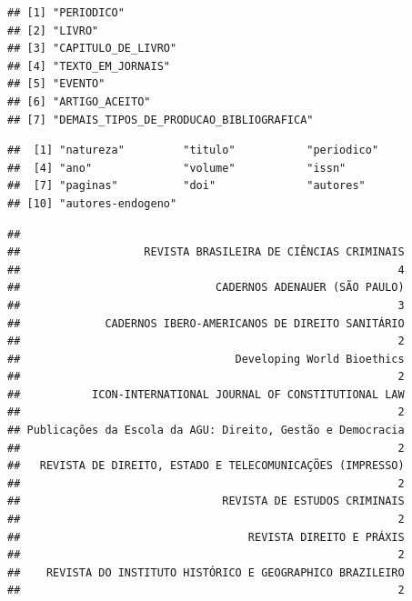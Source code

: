 \documentclass[]{article}
\newenvironment{Shaded}{\begin{snugshade}}{\end{snugshade}}
\newcommand{\KeywordTok}[1]{\textcolor[rgb]{0.13,0.29,0.53}{\textbf{#1}}}
\newcommand{\DataTypeTok}[1]{\textcolor[rgb]{0.13,0.29,0.53}{#1}}
\newcommand{\DecValTok}[1]{\textcolor[rgb]{0.00,0.00,0.81}{#1}}
\newcommand{\StringTok}[1]{\textcolor[rgb]{0.31,0.60,0.02}{#1}}
\newcommand{\OtherTok}[1]{\textcolor[rgb]{0.56,0.35,0.01}{#1}}
\newcommand{\OperatorTok}[1]{\textcolor[rgb]{0.81,0.36,0.00}{\textbf{#1}}}
\newcommand{\NormalTok}[1]{#1}
\begin{document}
\begin{verbatim}
## [1] "PERIODICO"                             
## [2] "LIVRO"                                 
## [3] "CAPITULO_DE_LIVRO"                     
## [4] "TEXTO_EM_JORNAIS"                      
## [5] "EVENTO"                                
## [6] "ARTIGO_ACEITO"                         
## [7] "DEMAIS_TIPOS_DE_PRODUCAO_BIBLIOGRAFICA"
\end{verbatim}

\begin{Shaded}
\end{Shaded}

\begin{verbatim}
##  [1] "natureza"         "titulo"           "periodico"       
##  [4] "ano"              "volume"           "issn"            
##  [7] "paginas"          "doi"              "autores"         
## [10] "autores-endogeno"
\end{verbatim}

\begin{Shaded}
\end{Shaded}

\begin{verbatim}
## 
##                   REVISTA BRASILEIRA DE CIÊNCIAS CRIMINAIS 
##                                                          4 
##                              CADERNOS ADENAUER (SÃO PAULO) 
##                                                          3 
##             CADERNOS IBERO-AMERICANOS DE DIREITO SANITÁRIO 
##                                                          2 
##                                 Developing World Bioethics 
##                                                          2 
##           ICON-INTERNATIONAL JOURNAL OF CONSTITUTIONAL LAW 
##                                                          2 
## Publicações da Escola da AGU: Direito, Gestão e Democracia 
##                                                          2 
##   REVISTA DE DIREITO, ESTADO E TELECOMUNICAÇÕES (IMPRESSO) 
##                                                          2 
##                               REVISTA DE ESTUDOS CRIMINAIS 
##                                                          2 
##                                   REVISTA DIREITO E PRÁXIS 
##                                                          2 
##    REVISTA DO INSTITUTO HISTÓRICO E GEOGRAPHICO BRAZILEIRO 
##                                                          2
\end{verbatim}
\end{document}
